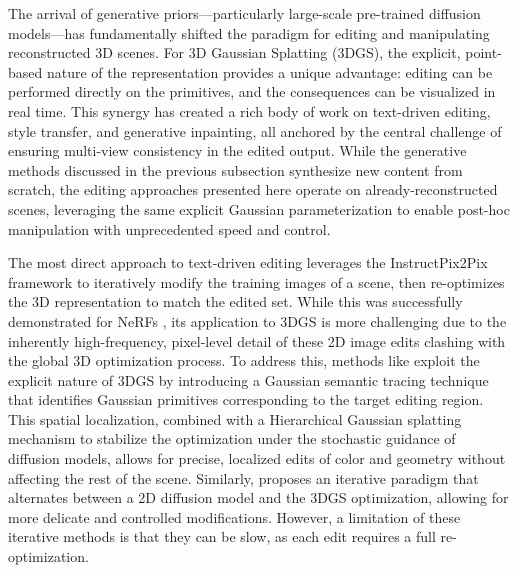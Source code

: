 \documentclass[11pt,a4paper]{article}
\begin{document}
The arrival of generative priors---particularly large-scale pre-trained diffusion models---has fundamentally shifted the paradigm for editing and manipulating reconstructed 3D scenes. For 3D Gaussian Splatting (3DGS), the explicit, point-based nature of the representation provides a unique advantage: editing can be performed directly on the primitives, and the consequences can be visualized in real time. This synergy has created a rich body of work on text-driven editing, style transfer, and generative inpainting, all anchored by the central challenge of ensuring multi-view consistency in the edited output. While the generative methods discussed in the previous subsection synthesize new content from scratch, the editing approaches presented here operate on already-reconstructed scenes, leveraging the same explicit Gaussian parameterization to enable post-hoc manipulation with unprecedented speed and control.

The most direct approach to text-driven editing leverages the InstructPix2Pix framework to iteratively modify the training images of a scene, then re-optimizes the 3D representation to match the edited set. While this was successfully demonstrated for NeRFs \cite{arxiv:2303.12789v2}, its application to 3DGS is more challenging due to the inherently high-frequency, pixel-level detail of these 2D image edits clashing with the global 3D optimization process. To address this, methods like \cite{arxiv:2311.14521v4} exploit the explicit nature of 3DGS by introducing a Gaussian semantic tracing technique that identifies Gaussian primitives corresponding to the target editing region. This spatial localization, combined with a Hierarchical Gaussian splatting mechanism to stabilize the optimization under the stochastic guidance of diffusion models, allows for precise, localized edits of color and geometry without affecting the rest of the scene. Similarly, \cite{arxiv:2311.16037v1} proposes an iterative paradigm that alternates between a 2D diffusion model and the 3DGS optimization, allowing for more delicate and controlled modifications. However, a limitation of these iterative methods is that they can be slow, as each edit requires a full re-optimization.
\end{document}
